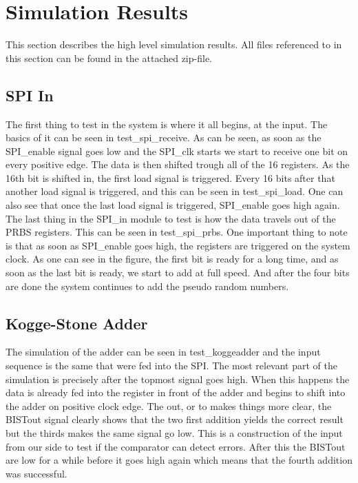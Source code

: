 \section{Simulation Results} \label{sec:simulation_results}
This section describes the high level simulation results. All files referenced to in this section can be found in the attached zip-file.
\subsection{SPI In}
The first thing to test in the system is where it all begins, at the input. The basics of it can be seen in test\_spi\_receive. As can be seen, as soon as the SPI\_enable signal goes low and the SPI\_clk starts we start to receive one bit on every positive edge. The data is then shifted trough all of the 16 registers. As the 16th bit is shifted in, the first load signal is triggered. Every 16 bits after that another load signal is triggered, and this can be seen in test\_spi\_load. One can also see that once the last load signal is triggered, SPI\_enable goes high again.\\
The last thing in the SPI\_in module to test is how the data travels out of the PRBS registers. This can be seen in test\_spi\_prbs. One important thing to note is that as soon as SPI\_enable goes high, the registers are triggered on the system clock. As one can see in the figure, the first bit is ready for a long time, and as soon as the last bit is ready, we start to add at full speed. And after the four bits are done the system continues to add the pseudo random numbers. 

\subsection{Kogge-Stone Adder}
The simulation of the adder can be seen in test\_koggeadder and the input sequence is the same that were fed into the SPI. The most relevant part of the simulation is precisely after the topmost signal goes high. When this happens the data is already fed into the register in front of the adder and begins to shift into the adder on positive clock edge. The out, or to makes things more clear, the BISTout signal clearly shows that the two first addition yields the correct result but the thirds makes the same signal go low. This is a construction of the input from our side to test if the comparator can detect errors. After this the BISTout are low for a while before it goes high again which means that the fourth addition was successful.

